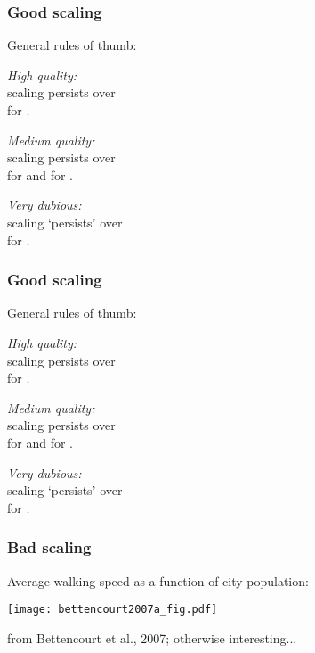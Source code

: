 \begin{frame}
  \frametitle{Good scaling}

General rules of thumb:

\textit{High quality:}\\ scaling persists 
over \\
for .

\textit{Medium quality:}\\ scaling persists
over \\
for  and 
 for .

\inv

\textit{Very dubious:}\\ scaling `persists'
over \\
for .


\end{frame}

\begin{frame}
  \frametitle{Good scaling}

General rules of thumb:

\textit{High quality:}\\ scaling persists 
over \\
for .

\textit{Medium quality:}\\ scaling persists
over \\
for  and 
 for .

\textit{Very dubious:}\\ scaling `persists'
over \\
for .



\end{frame}

\begin{frame}
  \frametitle{Bad scaling}

Average walking speed as a function of city population:

\texttt{[image: bettencourt2007a\_fig.pdf]}

{\small from Bettencourt et al., 2007; otherwise interesting...}

\end{frame}

